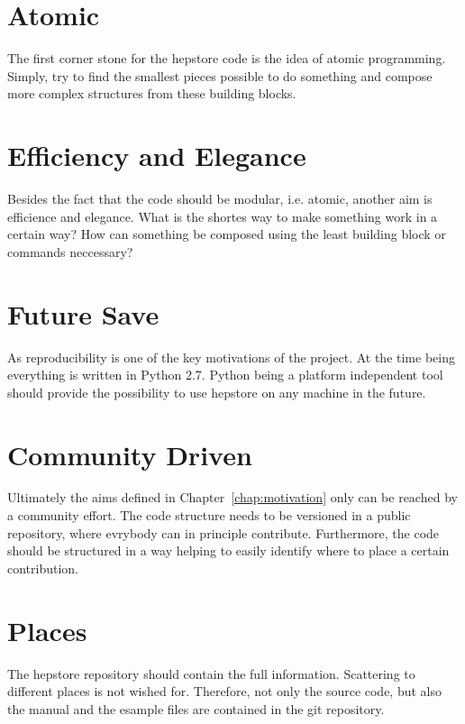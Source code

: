 
\section{Atomic}
The first corner stone for the hepstore code is the idea of atomic
programming. Simply, try to find the smallest pieces possible to do
something and compose more complex structures from these building
blocks.

\section{Efficiency and Elegance}
Besides the fact that the code should be modular, i.e. atomic, another
aim is efficience and elegance. What is the shortes way to make
something work in a certain way? How can something be composed using
the least building block or commands neccessary?

\section{Future Save}
As reproducibility is one of the key motivations of the project. At
the time being everything is written in Python 2.7. Python being a
platform independent tool should provide the possibility to use
hepstore on any machine in the future.

\section{Community Driven}
Ultimately the aims defined in Chapter~\ref{chap:motivation} only can
be reached by a community effort. The code structure needs to be
versioned in a public repository, where evrybody can in principle
contribute. Furthermore, the code should be structured in a way
helping to easily identify where to place a certain contribution.

\section{Places}
The hepstore repository should contain the full
information. Scattering to different places is not wished
for. Therefore, not only the source code, but also the manual and the
esample files are contained in the git repository.
